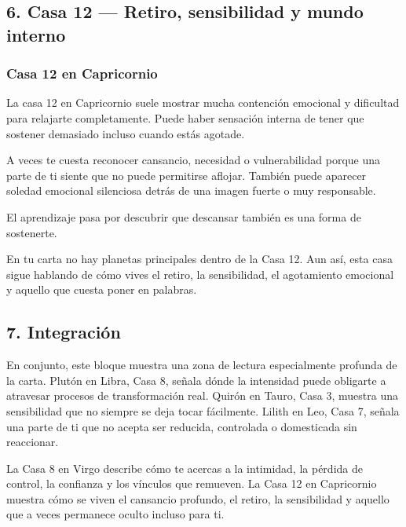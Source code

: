 \documentclass[11pt,a4paper]{article}
\begin{document}
\vspace{0.4cm}

\subsection{6. Casa 12 — Retiro, sensibilidad y mundo interno}

\subsubsection*{Casa 12 en Capricornio}

La casa 12 en Capricornio suele mostrar mucha contención emocional y dificultad para relajarte completamente. Puede haber sensación interna de tener que sostener demasiado incluso cuando estás agotade.

A veces te cuesta reconocer cansancio, necesidad o vulnerabilidad porque una parte de ti siente que no puede permitirse aflojar. También puede aparecer soledad emocional silenciosa detrás de una imagen fuerte o muy responsable.

El aprendizaje pasa por descubrir que descansar también es una forma de sostenerte.

En tu carta no hay planetas principales dentro de la Casa 12. Aun así, esta casa sigue hablando de cómo vives el retiro, la sensibilidad, el agotamiento emocional y aquello que cuesta poner en palabras.

\vspace{0.4cm}

\subsection{7. Integración}

En conjunto, este bloque muestra una zona de lectura especialmente profunda de la carta. Plutón en Libra, Casa 8, señala dónde la intensidad puede obligarte a atravesar procesos de transformación real. Quirón en Tauro, Casa 3, muestra una sensibilidad que no siempre se deja tocar fácilmente. Lilith en Leo, Casa 7, señala una parte de ti que no acepta ser reducida, controlada o domesticada sin reaccionar.

La Casa 8 en Virgo describe cómo te acercas a la intimidad, la pérdida de control, la confianza y los vínculos que remueven. La Casa 12 en Capricornio muestra cómo se viven el cansancio profundo, el retiro, la sensibilidad y aquello que a veces permanece oculto incluso para ti.
\end{document}
